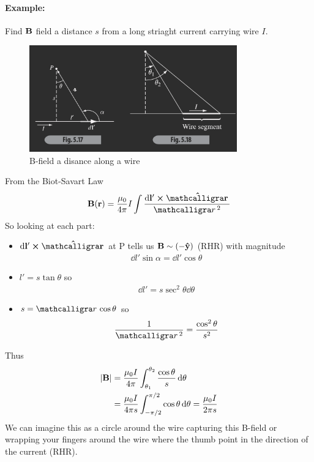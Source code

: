 \documentclass[../main.tex]{subfiles}
\begin{document}
\newpage
\paragraph{Example:} Find $\vb B$ field a distance $s$ from a long striaght current carrying wire $I$.

\begin{figure}[ht]
    \centering
    \includegraphics[width=0.8\textwidth]{fig5_17_18.png}
    \caption{B-field a disance along a wire}
    \label{fig:fig5_17}
\end{figure}

From the Biot-Savart Law
\begin{align*}
    \vb B (\vb r) = \frac{\mu_0}{4\pi} I \int \frac{\dd{\vb l'} \cross \vu{\scriptr}}{\scriptr^2}
\end{align*}
So looking at each part:
\begin{itemize}
    \item $\dd{\vb l' \cross \vu{\scriptr}}$ at P tells us $\vb B \sim (-\vu y)$ (RHR)
    with magnitude
    \begin{align*}
        \dd{l'} \sin\alpha = \dd{l'} \cos\theta
    \end{align*}
    \item $l' = s\tan\theta$ so
    \begin{align*}
        \dd{l'} = s \sec^2\theta \dd{\theta}
    \end{align*}
    \item $s = \scriptr \cos\theta$ so 
    \begin{align*}
        \frac{1}{\scriptr^2} = \frac{\cos^2\theta}{s^2}
    \end{align*}
\end{itemize}
\newpage
Thus
\begin{align*}
    \abs{\vb B} &= \frac{\mu_0 I}{4\pi} \int_{\theta_1}^{\theta_2} \frac{\cos\theta}{s} \dd{\theta} \\
    &= \frac{\mu_0 I}{4\pi s} \int_{-\pi/2}^{\pi/2} \cos\theta \dd{\theta} = \frac{\mu_0 I}{2\pi s}
\end{align*}
We can imagine this as a circle around the wire capturing this B-field or wrapping your fingers around the wire where the thumb point in the direction of the current (RHR).
\end{document}
